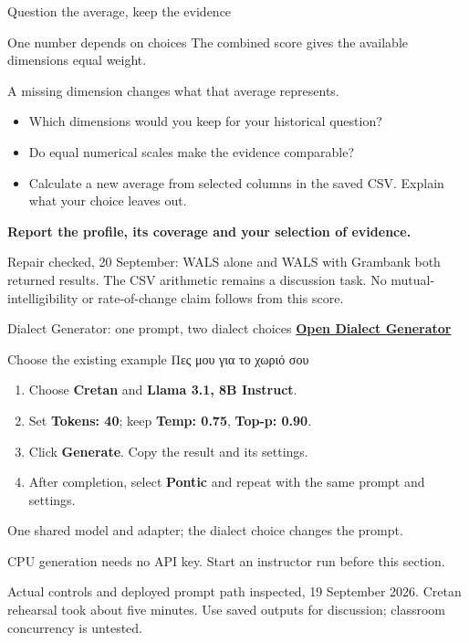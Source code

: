 \documentclass[aspectratio=169,10pt]{beamer}
\newcommand{\key}[1]{\textcolor{aegean}{\textbf{#1}}}
\newcommand{\source}[1]{\vfill{\scriptsize\color{slate}#1\par}}
\newcommand{\question}[1]{\medskip\par\key{#1}\par}
\begin{document}
\begin{frame}{Question the average, keep the evidence}
  \small
  \begin{block}{One number depends on choices}
    The combined score gives the available dimensions equal weight.\par
    A missing dimension changes what that average represents.
  \end{block}
  \begin{itemize}
    \item Which dimensions would you keep for your historical question?
    \item Do equal numerical scales make the evidence comparable?
    \item Calculate a new average from selected columns in the saved CSV. Explain what your choice leaves out.
  \end{itemize}
  \question{Report the profile, its coverage and your selection of evidence.}
  \source{Repair checked, 20 September: WALS alone and WALS with Grambank both returned results.\newline
  The CSV arithmetic remains a discussion task. No mutual-intelligibility or rate-of-change claim follows from this score.}
\end{frame}

\begin{frame}{Dialect Generator: one prompt, two dialect choices}
  \small
  \href{https://dialect-gen-cpu.blackplant-0f676054.westeurope.azurecontainerapps.io}{\key{Open Dialect Generator}}
  \begin{block}{Choose the existing example}
    \large Πες μου για το χωριό σου
  \end{block}
  \begin{enumerate}
    \item Choose \textbf{Cretan} and \textbf{Llama 3.1, 8B Instruct}.
    \item Set \textbf{Tokens: 40}; keep \textbf{Temp: 0.75}, \textbf{Top-p: 0.90}.
    \item Click \textbf{Generate}. Copy the result and its settings.
    \item After completion, select \textbf{Pontic} and repeat with the same prompt and settings.
  \end{enumerate}
  \small One shared model and adapter; the dialect choice changes the prompt.\par
  CPU generation needs no API key. Start an instructor run before this section.
  \source{Actual controls and deployed prompt path inspected, 19 September 2026.\newline
  Cretan rehearsal took about five minutes. Use saved outputs for discussion; classroom concurrency is untested.}
\end{frame}
\end{document}
